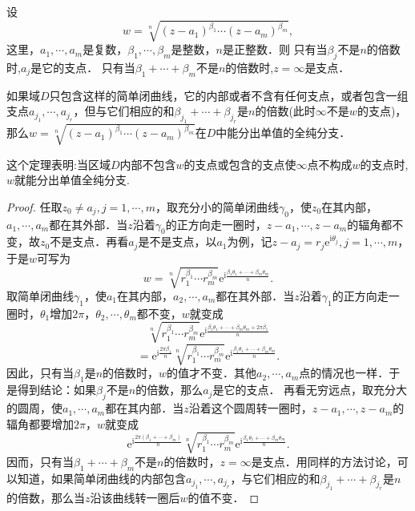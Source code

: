 \documentclass[../../main.tex]{subfiles}%
\begin{document}
\begin{theorem}\label{theorem:多值函数分出单值全纯分支}
设
\[
w = \sqrt[n]{(z - a_1)^{\beta_1} \cdots (z - a_m)^{\beta_m}},
\]
这里，$a_1, \cdots, a_m$是复数，$\beta_1, \cdots, \beta_m$是整数，$n$是正整数．则
只有当$\beta_j$不是$n$的倍数时,$a_j$是它的支点．
只有当$\beta_1 + \cdots + \beta_m$不是$n$的倍数时,$z = \infty$是支点．

如果域$D$只包含这样的简单闭曲线，它的内部或者不含有任何支点，或者包含一组支点$a_{j_1}, \cdots, a_{j_r}$，但与它们相应的和$\beta_{j_1} + \cdots + \beta_{j_r}$是$n$的倍数(此时$\infty$不是$w$的支点)，那么$w = \sqrt[n]{(z - a_1)^{\beta_1} \cdots (z - a_m)^{\beta_m}}$在$D$中能分出单值的全纯分支．
\end{theorem}
\begin{remark}
这个定理表明:当区域$D$内部不包含$w$的支点或包含的支点使$\infty$点不构成$w$的支点时,$w$就能分出单值全纯分支.
\end{remark}
\begin{proof}
任取$z_0 \neq a_j, j = 1, \cdots, m$，取充分小的简单闭曲线$\gamma_0$，使$z_0$在其内部，$a_1, \cdots, a_m$都在其外部．当$z$沿着$\gamma_0$的正方向走一圈时，$z - a_1, \cdots, z - a_m$的辐角都不变，故$z_0$不是支点．再看$a_j$是不是支点，以$a_1$为例，记$z - a_j = r_j \text{e}^{\text{i}\theta_j}, j = 1, \cdots, m$，于是$w$可写为
\[
w = \sqrt[n]{r_1^{\beta_1} \cdots r_m^{\beta_m}} \text{e}^{\text{i}\frac{\beta_1 \theta_1 + \cdots + \beta_m \theta_m}{n}}.
\]
取简单闭曲线$\gamma_1$，使$a_1$在其内部，$a_2, \cdots, a_m$都在其外部．当$z$沿着$\gamma_1$的正方向走一圈时，$\theta_1$增加$2\pi$，$\theta_2, \cdots, \theta_m$都不变，$w$就变成
\[
\sqrt[n]{r_1^{\beta_1} \cdots r_m^{\beta_m}} \text{e}^{\text{i}\frac{\beta_1 \theta_1 + \cdots + \beta_m \theta_m + 2\pi \beta_1}{n}}
\]
\[
= \text{e}^{\text{i}\frac{2\pi \beta_1}{n}} \sqrt[n]{r_1^{\beta_1} \cdots r_m^{\beta_m}} \text{e}^{\text{i}\frac{\beta_1 \theta_1 + \cdots + \beta_m \theta_m}{n}}.
\]
因此，只有当$\beta_1$是$n$的倍数时，$w$的值才不变．其他$a_2, \cdots, a_m$点的情况也一样．于是得到结论：如果$\beta_j$不是$n$的倍数，那么$a_j$是它的支点．
再看无穷远点，取充分大的圆周，使$a_1, \cdots, a_m$都在其内部．当$z$沿着这个圆周转一圈时，$z - a_1, \cdots, z - a_m$的辐角都要增加$2\pi$，$w$就变成
\[
\text{e}^{\text{i}\frac{2\pi (\beta_1 + \cdots + \beta_m)}{n}} \sqrt[n]{r_1^{\beta_1} \cdots r_m^{\beta_m}} \text{e}^{\text{i}\frac{\beta_1 \theta_1 + \cdots + \beta_m \theta_m}{n}}.
\]
因而，只有当$\beta_1 + \cdots + \beta_m$不是$n$的倍数时，$z = \infty$是支点．用同样的方法讨论，可以知道，如果简单闭曲线的内部包含$a_{j_1}, \cdots, a_{j_r}$，与它们相应的和$\beta_{j_1} + \cdots + \beta_{j_r}$是$n$的倍数，那么当$z$沿该曲线转一圈后$w$的值不变．
\end{proof}
\end{document}
